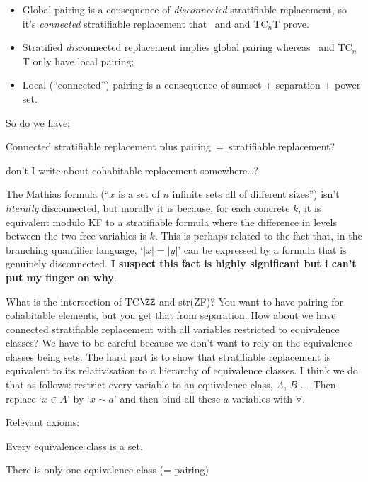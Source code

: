 \documentclass[12pt]{article}
\begin{document}
{\begin{itemize}
\item Global pairing is a consequence of {\sl disconnected} stratifiable
replacement, so it's {\sl connected} stratifiable replacement that \TZT\ and and TC$_n$T prove.

\item Stratified {\sl dis}connected replacement implies global pairing
whereas \TZT\ and TC$_n$T only have local pairing;

\item Local (``connected'') pairing is a consequence of sumset + separation + power set.
\end{itemize}

So do we have:

Connected stratifiable replacement plus pairing\, =\, stratifiable replacement?

don't I write about cohabitable replacement somewhere\ldots?

The Mathias formula (``$x$ is a set of $n$ infinite sets all of
different sizes'') isn't {\sl literally} disconnected, but morally it
is because, for each concrete $k$, it is equivalent modulo KF to a
stratifiable formula where the difference in levels between the two
free variables is $k$. This is perhaps related to the fact that, in
the branching quantifier language, `$|x| = |y|$' can be expressed by a
formula that is genuinely disconnected.  {\bf I suspect this fact is
  highly significant but i can't put my finger on why}.


What is the intersection of TC$\ZZ$ and str(ZF)?  You want to have
pairing for cohabitable elements, but you get that from separation. How
about we have connected stratifiable replacement with all variables
restricted to equivalence classes?  We have to be careful because we
don't want to rely on the equivalence classes being sets.  The hard
part is to show that stratifiable replacement is equivalent to its
relativisation to a hierarchy of equivalence classes.  I think we do
that as follows: restrict every variable to an equivalence class, $A$,
$B$ \ldots.  Then replace `$x \in A$' by `$x \sim a$' and then bind all
these $a$ variables with $\forall$. 

\bigskip

Relevant axioms:

\smallskip

Every equivalence class is a set.

\smallskip

There is only one equivalence class (= pairing)

}
\end{document}
